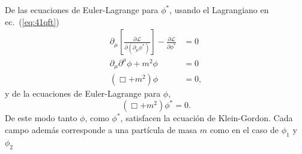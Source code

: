 De las ecuaciones de Euler-Lagrange para $\phi^*$, usando el Lagrangiano en ec.~(\ref{eq:41qft})
\begin{align}
  \partial_\mu\left[
      \frac{\partial\mathcal{L}}{\partial(\partial_\mu\phi^*)}\right]-\frac{\partial\mathcal{L}}{\partial\phi^*}&=0\nonumber\\
    \partial_\mu\partial^\mu\phi+m^2\phi&=0\nonumber\\
    \label{eq:43qft}
    (\Box+m^2)\phi&=0,
\end{align}
y de la ecuaciones de Euler-Lagrange para $\phi$,
\begin{equation}
  \label{eq:44qft}
    (\Box+m^2)\phi^*=0.
\end{equation}
De este modo tanto $\phi$, como $\phi^*$, satisfacen la ecuación de Klein-Gordon. Cada campo además corresponde a una partícula de masa $m$ como en el caso de $\phi_1$ y $\phi_2$

